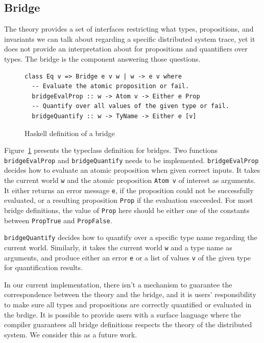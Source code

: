 \documentclass[format=acmsmall, nonacm=true, review=true, screen=true]{acmart}
\newcommand{\mycaption}[1]{\Description{#1}\caption{#1}}
\begin{document}
\subsection{Bridge}
\label{subsec:bridge}

The theory provides a set of interfaces restricting what types, propositions, and invariants we can talk about regarding a specific distributed system trace, yet it does not provide an interpretation about for propositions and quantifiers over types.
The bridge is the component answering those questions.

\begin{figure}[h]
  {
    \fontsize{10}{12}\selectfont
    \begin{verbatim}
class Eq v => Bridge e v w | w -> e v where
  -- Evaluate the atomic proposition or fail.
  bridgeEvalProp :: w -> Atom v -> Either e Prop
  -- Quantify over all values of the given type or fail.
  bridgeQuantify :: w -> TyName -> Either e [v]
\end{verbatim}
  }
  \mycaption{Haskell definition of a bridge}
  \label{fig:bridge-sig}
\end{figure}

Figure~\ref{fig:bridge-sig} presents the typeclass definition for bridges.
Two functions \texttt{bridgeEvalProp} and \texttt{bridgeQuantify} needs to be implemented.
\texttt{bridgeEvalProp} decides how to evaluate an atomic proposition when given correct inputs. It takes the current world \texttt{w} and the atomic proposition \texttt{Atom v} of interest as arguments.
It either returns an error message \texttt{e}, if the proposition could not be successfully evaluated, or a resulting proposition \texttt{Prop} if the evaluation succeeded.
For most bridge definitions, the value of \texttt{Prop} here should be either one of the constants between \texttt{PropTrue} and \texttt{PropFalse}.

\texttt{bridgeQuantify} decides how to quantify over a specific type name regarding the current world.
Similarly, it takes the current world \texttt{w} and a type name as arguments, and produce either an error \texttt{e} or a list of values \texttt{v} of the given type for quantification results.

In our current implementation, there isn't a mechanism to guarantee the correspondence between the theory and the bridge, and it is users' responsibility to make sure all types and propositions are correctly quantified or evaluated in the brdige.
It is possible to provide users with a surface language where the compiler guarantees all bridge definitions respects the theory of the distributed system. We consider this as a future work.
\end{document}
